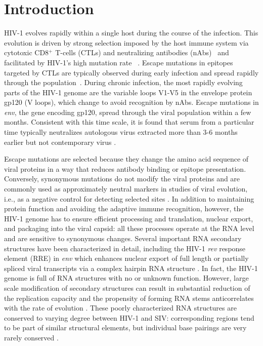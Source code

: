 \documentclass[11pt]{article}
\newcommand{\env}{\textit{env}}
\newcommand{\rev}{\textit{rev}}
\begin{document}
\section*{Introduction}
HIV-1 evolves rapidly within a single host during the course of the infection.
This evolution is driven by strong selection imposed by the host immune system
via cytotoxic CD8${}^+$ T-cells (CTLs) and neutralizing antibodies
(nAbs)~\citep{rambaut_causes_2004} and facilitated by HIV-1's high mutation rate
~\citep{mansky_lower_1995,abram_nature_2010}. Escape mutations
in epitopes targeted by CTLs are typically observed during early infection and spread
rapidly through the population~\citep{mcmichael_immune_2009}. During chronic
infection, the most rapidly evolving parts of the HIV-1 genome are the variable
loops V1-V5 in the envelope protein gp120 (V loops), which change to avoid recognition by
nAbs. Escape mutations in \env{}, the gene encoding gp120, spread through the
viral population within a few months.
Consistent with this time scale, it is found that serum from a particular time
typically neutralizes autologous virus extracted more than 3-6 months earlier but not contemporary
virus \citep{richman_rapid_2003}.

Escape mutations are selected because they change the amino acid sequence of
viral proteins in a way that reduces antibody binding or epitope presentation.
Conversely, synonymous mutations do not modify the viral proteins and are
commonly used as approximately neutral markers in studies of viral evolution,
i.e., as a negative control for detecting selected
sites \citep{Bhatt:2011p43255,Hurst:2002p32608,Chen:2004p22606}. In addition to
maintaining protein function and avoiding the adaptive immune recognition,
however, the HIV-1 genome has to ensure efficient processing and translation,
nuclear export, and packaging into the viral capsid: all these processes operate
at the RNA level and are sensitive to synonymous changes. Several
important RNA secondary structures have been characterized in detail, including the HIV-1
\rev{} response element (RRE) in \env{} which enhances nuclear export of full length
or partially spliced viral transcripts via a complex hairpin RNA structure
\citep{fernandes_hiv-1_2012}. In fact, the HIV-1 genome is full of RNA
structures \citep{watts_architecture_2009} with no or unknown
function. However, large scale modification of secondary structures
can result in substantial reduction of the replication capacity
\citep{keating_rich_2009} and the propensity of forming RNA stems
anticorrelates with the rate of evolution
\citep{forsdyke_reciprocal_1995,snoeck_mapping_2011}. 
These poorly characterized RNA structures are conserved to varying degree between HIV-1 and
SIV: corresponding regions tend to be part
of similar structural elements, but individual base pairings are very
rarely conserved \citep{pollom_comparison_2013}. 
\end{document}
